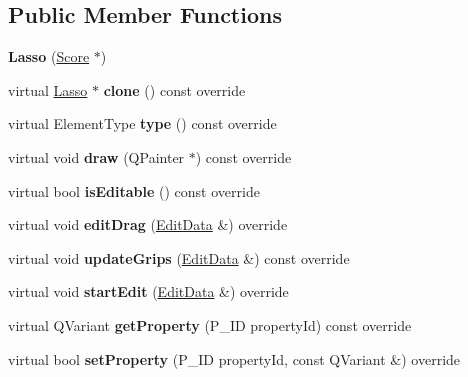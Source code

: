 \subsection*{Public Member Functions}
\begin{DoxyCompactItemize}
\item 
\mbox{\label{class_ms_1_1_lasso_a35245db2a8e357843884275a7d6b98d9}} 
{\bfseries Lasso} (\hyperlink{class_ms_1_1_score}{Score} $\ast$)
\item 
\mbox{\label{class_ms_1_1_lasso_a76adb652883a1260fdf5d3ea0653a0c1}} 
virtual \hyperlink{class_ms_1_1_lasso}{Lasso} $\ast$ {\bfseries clone} () const override
\item 
\mbox{\label{class_ms_1_1_lasso_a954b5da3d7455b74fe4d549923bf703a}} 
virtual Element\+Type {\bfseries type} () const override
\item 
\mbox{\label{class_ms_1_1_lasso_a6ba5f178688bbfad3bd77f6349d6908c}} 
virtual void {\bfseries draw} (Q\+Painter $\ast$) const override
\item 
\mbox{\label{class_ms_1_1_lasso_a10de6b63e869aaa553784d8b7d8a2747}} 
virtual bool {\bfseries is\+Editable} () const override
\item 
\mbox{\label{class_ms_1_1_lasso_a5ef5abdbd7abcb2dbcada208dea5558c}} 
virtual void {\bfseries edit\+Drag} (\hyperlink{class_ms_1_1_edit_data}{Edit\+Data} \&) override
\item 
\mbox{\label{class_ms_1_1_lasso_a7431a1ccaa72e295d22fe92b13b61f60}} 
virtual void {\bfseries update\+Grips} (\hyperlink{class_ms_1_1_edit_data}{Edit\+Data} \&) const override
\item 
\mbox{\label{class_ms_1_1_lasso_ab5a57517a61e102ffb8a2602c26d436d}} 
virtual void {\bfseries start\+Edit} (\hyperlink{class_ms_1_1_edit_data}{Edit\+Data} \&) override
\item 
\mbox{\label{class_ms_1_1_lasso_a7221e4447b2cc9be1086d55e4f0ffef2}} 
virtual Q\+Variant {\bfseries get\+Property} (P\+\_\+\+ID property\+Id) const override
\item 
\mbox{\label{class_ms_1_1_lasso_aaa6fa9d6b7c6682ad4d433ce2abc49be}} 
virtual bool {\bfseries set\+Property} (P\+\_\+\+ID property\+Id, const Q\+Variant \&) override
\end{DoxyCompactItemize}
